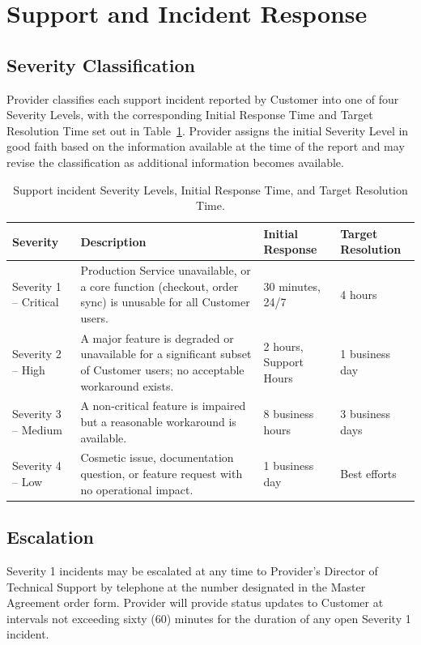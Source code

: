 \section{Support and Incident Response}
\label{sec:support}

\subsection{Severity Classification}
Provider classifies each support incident reported by Customer into one of four Severity Levels, with the corresponding Initial Response Time and Target Resolution Time set out in Table~\ref{tab:severity}. Provider assigns the initial Severity Level in good faith based on the information available at the time of the report and may revise the classification as additional information becomes available.

\begin{table}[H]
\centering
\small
\begin{tabular}{@{}p{2.1cm}p{5.0cm}p{2.6cm}p{2.6cm}@{}}
\toprule
\textbf{Severity} & \textbf{Description} & \textbf{Initial Response} & \textbf{Target Resolution} \\
\midrule
Severity 1 -- Critical & Production Service unavailable, or a core function (checkout, order sync) is unusable for all Customer users. & 30 minutes, 24/7 & 4 hours \\
\addlinespace
Severity 2 -- High & A major feature is degraded or unavailable for a significant subset of Customer users; no acceptable workaround exists. & 2 hours, Support Hours & 1 business day \\
\addlinespace
Severity 3 -- Medium & A non-critical feature is impaired but a reasonable workaround is available. & 8 business hours & 3 business days \\
\addlinespace
Severity 4 -- Low & Cosmetic issue, documentation question, or feature request with no operational impact. & 1 business day & Best efforts \\
\bottomrule
\end{tabular}
\caption{Support incident Severity Levels, Initial Response Time, and Target Resolution Time.}
\label{tab:severity}
\end{table}

\subsection{Escalation}
Severity 1 incidents may be escalated at any time to Provider's Director of Technical Support by telephone at the number designated in the Master Agreement order form. Provider will provide status updates to Customer at intervals not exceeding sixty (60) minutes for the duration of any open Severity 1 incident.

